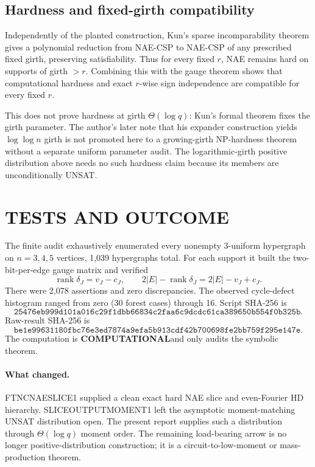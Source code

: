 \documentclass[11pt]{article}
\newcommand{\COMP}{\textbf{COMPUTATIONAL}}
\begin{document}
\subsection{Hardness and fixed-girth compatibility}
Independently of the planted construction, Kun's sparse incomparability theorem gives a polynomial reduction from NAE-CSP to NAE-CSP of any prescribed fixed girth, preserving satisfiability. Thus for every fixed $r$, NAE remains hard on supports of girth $>r$. Combining this with the gauge theorem shows that computational hardness and exact $r$-wise sign independence are compatible for every fixed $r$.

This does not prove hardness at girth $\Theta(\log q)$: Kun's formal theorem fixes the girth parameter. The author's later note that his expander construction yields $\log\log n$ girth is not promoted here to a growing-girth NP-hardness theorem without a separate uniform parameter audit. The logarithmic-girth positive distribution above needs no such hardness claim because its members are unconditionally UNSAT.

\section{TESTS AND OUTCOME}
The finite audit exhaustively enumerated every nonempty 3-uniform hypergraph on $n=3,4,5$ vertices, 1,039 hypergraphs total. For each support it built the two-bit-per-edge gauge matrix and verified
\[\operatorname{rank}\delta_J=v_J-c_J,\qquad 2|E|-\operatorname{rank}\delta_J=2|E|-v_J+c_J.\]
There were 2,078 assertions and zero discrepancies. The observed cycle-defect histogram ranged from zero (30 forest cases) through 16. Script SHA-256 is
\[\texttt{25476eb999d101a016c29f1dbb66834c2faa6c9dcdc61ca389650b554f0b325b}.\]
Raw-result SHA-256 is
\[\texttt{be1e99631180fbc76e3ed7874a9efa5b913cdf42b700698fe2bb759f295e147e}.\]
The computation is \COMP and only audits the symbolic theorem.

\paragraph{What changed.}
FTNCNAESLICE1 supplied a clean exact hard NAE slice and even-Fourier HD hierarchy. SLICEOUTPUTMOMENT1 left the asymptotic moment-matching UNSAT distribution open. The present report supplies such a distribution through $\Theta(\log q)$ moment order. The remaining load-bearing arrow is no longer positive-distribution construction; it is a circuit-to-low-moment or mass-production theorem.
\end{document}
